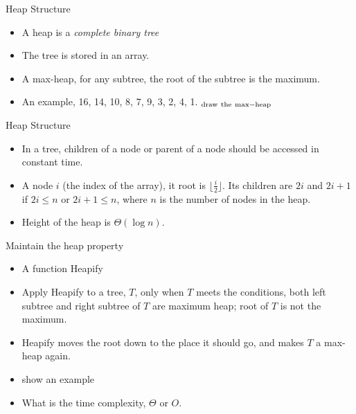 \documentclass{beamer}
\begin{document}
\begin{frame}{}
\begin{center}
Heap Structure
\end{center}
\begin{itemize}
\item A heap is a {\it complete binary tree}
\item The tree is stored in an array.  
\item A max-heap, for any subtree, the root of the subtree is the maximum.  
\item An example, 16, 14, 10, 8, 7, 9, 3, 2, 4, 1. $_{\rm draw\ the\ max-heap} $
\end{itemize}
\end{frame}

\begin{frame}{}
\begin{center}
Heap Structure
\end{center}
\begin{itemize}
\item In a tree, children of a node or parent of a node should be accessed
 in constant time. 
\item A node $i$ (the index of the array), it root is 
 $\lfloor \frac{i}{2} \rfloor$.  
 Its children are $2i$ and $2i+1$ if $2i\le n$ or $2i+1\le n$,
 where $n$ is the number of nodes in the heap.  
\item Height of the heap is $\Theta (\log n)$.
\end{itemize}
\end{frame}

\begin{frame}{}
\begin{center}
{\large Maintain the heap property}
\end{center}
\begin{itemize}
\item A function {\sc Heapify}
\item Apply {\sc  Heapify} to a tree, $T$, only when $T$ meets the conditions, 
 both left subtree and right subtree of $T$ are maximum heap; root of $T$ 
 is not the maximum.  
\item {\sc Heapify} moves the root down to the place it should go, and 
 makes $T$ a max-heap again.  
\item show an example
\item What is the time complexity, $\Theta$ or $O$.  
\end{itemize}
\end{frame}
\end{document}
